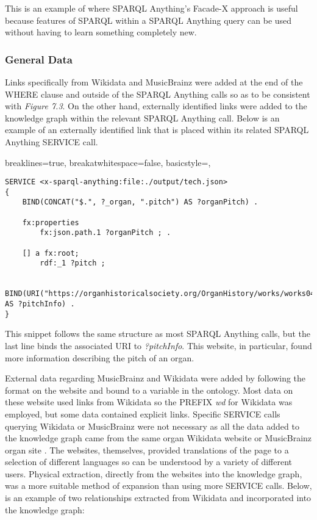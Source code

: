 This is an example of where SPARQL Anything's Facade-X approach is useful because features of SPARQL within a SPARQL Anything query can be used without having to learn something completely new. 

\subsubsection{General Data}
\hspace*{0.5cm} Links specifically from Wikidata and MusicBrainz were added at the end of the WHERE clause and outside of the SPARQL Anything calls so as to be consistent with \textit{Figure 7.3}. On the other hand, externally identified links were added to the knowledge graph within the relevant SPARQL Anything call. Below is an example of an externally identified link that is placed within its related SPARQL Anything SERVICE call.

\lstset
{
    breaklines=true,
    breakatwhitespace=false,
    basicstyle=\linespread{1.25}\ttfamily,
}
\begin{lstlisting}
SERVICE <x-sparql-anything:file:./output/tech.json>
{
    BIND(CONCAT("$.", ?_organ, ".pitch") AS ?organPitch) .

    fx:properties
        fx:json.path.1 ?organPitch ; .

    [] a fx:root; 
        rdf:_1 ?pitch ;
    
    BIND(URI("https://organhistoricalsociety.org/OrganHistory/works/works04.htm") AS ?pitchInfo) .
} 
\end{lstlisting}

This snippet follows the same structure as most SPARQL Anything calls, but the last line binds the associated URI to \textit{?pitchInfo}. This website, in particular, found more information describing the pitch of an organ. 

External data regarding MusicBrainz and Wikidata were added by following the format on the website and bound to a variable in the ontology. Most data on these website used links from Wikidata so the PREFIX \textit{wd} for Wikidata was employed, but some data contained explicit links. Specific SERVICE calls querying Wikidata or MusicBrainz were not necessary as all the data added to the knowledge graph came from the same organ Wikidata website \cite{organwikidata} or MusicBrainz organ site \cite{organmusicbrainz}. The websites, themselves, provided translations of the page to a selection of different languages so can be understood by a variety of different users. Physical extraction, directly from the websites into the knowledge graph, was a more suitable method of expansion than using more SERVICE calls. Below, is an example of two relationships extracted from Wikidata and incorporated into the knowledge graph:


